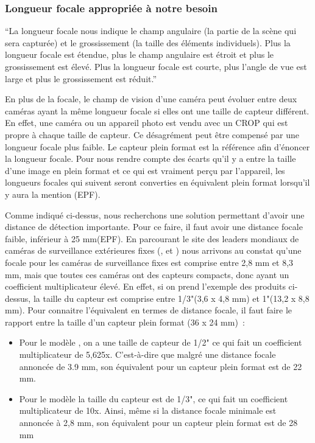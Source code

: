 \subsubsection{Longueur focale appropriée à notre besoin}
\label{sec:camera_focale}

\enquote{La longueur focale nous indique le champ angulaire (la partie de la scène qui sera capturée)
    et le grossissement (la taille des éléments individuels).
    Plus la longueur focale est étendue, plus le champ angulaire est étroit et plus le grossissement est élevé.
    Plus la longueur focale est courte, plus l’angle de vue est large et plus le grossissement est réduit.} \cite{focale}

En plus de la focale, le champ de vision d'une caméra peut évoluer entre deux caméras ayant la même longueur focale
si elles ont une taille de capteur différent.
En effet, une caméra ou un appareil photo est vendu avec un \gls{CROP} qui est propre à chaque taille de capteur.
Ce désagrément peut être compensé par une longueur focale plus faible.
Le capteur plein format est la référence afin d'énoncer la longueur focale.
Pour nous rendre compte des écarts qu'il y a entre la taille d'une image en plein format et ce qui est vraiment perçu par l'appareil,
les longueurs focales qui suivent seront converties en équivalent plein format lorsqu'il y aura la mention (EPF).

Comme indiqué ci-dessus, nous recherchons une solution permettant d'avoir une distance de détection importante.
Pour ce faire, il faut avoir une distance focale faible, inférieur à 25 mm(EPF).
En parcourant le site des leaders mondiaux de caméras de surveillance extérieures fixes
(\cite{pelco}, \cite{axis} et \cite{panasonic})
nous arrivons au constat qu'une focale pour les caméras de surveillance fixes est comprise entre 2,8 mm et 8,3 mm, mais que toutes ces caméras ont des capteurs compacts, donc ayant un coefficient multiplicateur élevé.
En effet, si on prend l'exemple des produits ci-dessus, la taille du capteur est comprise entre 1/3"(3,6 x 4,8 mm) et 1"(13,2 x 8,8 mm).
Pour connaitre l'équivalent en termes de distance focale, il faut faire le rapport entre la taille d'un capteur plein format (36 x 24 mm) :
\begin{itemize}
    \item Pour le modèle \cite[AXIS Q1645]{axisQ1645}, on a une taille de capteur de 1/2"
          ce qui fait un coefficient multiplicateur de 5,625x. C'est-à-dire que malgré une distance focale annoncée de 3.9 mm, son équivalent pour un capteur plein format est de 22 mm.
    \item Pour le modèle \cite[Panasonic i-Pro Extreme WV-S1531LN - network surveillance camera]{panaIPro}
          la taille du capteur est de 1/3", ce qui fait un coefficient multiplicateur de 10x. Ainsi, même si la distance focale minimale est annoncée à 2,8 mm, son équivalent pour un capteur plein format est de 28 mm
\end{itemize}

